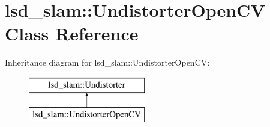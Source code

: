 \hypertarget{classlsd__slam_1_1_undistorter_open_c_v}{\section{lsd\-\_\-slam\-:\-:Undistorter\-Open\-C\-V Class Reference}
\label{classlsd__slam_1_1_undistorter_open_c_v}
}
Inheritance diagram for lsd\-\_\-slam\-:\-:Undistorter\-Open\-C\-V\-:\begin{figure}[H]
\begin{center}
\leavevmode
\includegraphics[height=2.000000cm]{classlsd__slam_1_1_undistorter_open_c_v}
\end{center}
\end{figure}
